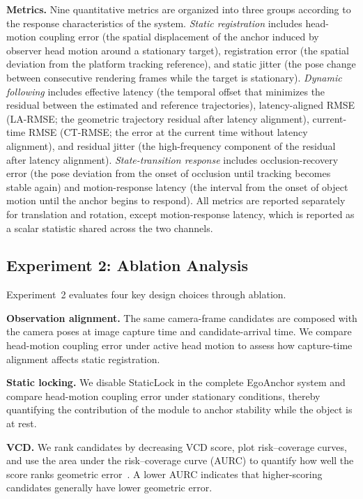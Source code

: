 \documentclass[review]{vgtc}
\begin{document}
\textbf{Metrics.}
Nine quantitative metrics are organized into three groups according to the response characteristics of the system. \textit{Static registration} includes head-motion coupling error (the spatial displacement of the anchor induced by observer head motion around a stationary target), registration error (the spatial deviation from the platform tracking reference), and static jitter (the pose change between consecutive rendering frames while the target is stationary). \textit{Dynamic following} includes effective latency (the temporal offset that minimizes the residual between the estimated and reference trajectories), latency-aligned RMSE (LA-RMSE; the geometric trajectory residual after latency alignment), current-time RMSE (CT-RMSE; the error at the current time without latency alignment), and residual jitter (the high-frequency component of the residual after latency alignment). \textit{State-transition response} includes occlusion-recovery error (the pose deviation from the onset of occlusion until tracking becomes stable again) and motion-response latency (the interval from the onset of object motion until the anchor begins to respond). All metrics are reported separately for translation and rotation, except motion-response latency, which is reported as a scalar statistic shared across the two channels.

\subsection{Experiment 2: Ablation Analysis}\label{sec:exp2-design}

Experiment~2 evaluates four key design choices through ablation.

\textbf{Observation alignment.}
The same camera-frame candidates are composed with the camera poses at image capture time and candidate-arrival time. We compare head-motion coupling error under active head motion to assess how capture-time alignment affects static registration.

\textbf{Static locking.}
We disable StaticLock in the complete EgoAnchor system and compare head-motion coupling error under stationary conditions, thereby quantifying the contribution of the module to anchor stability while the object is at rest.

\textbf{VCD.}
We rank candidates by decreasing VCD score, plot risk--coverage curves, and use the area under the risk--coverage curve (AURC) to quantify how well the score ranks geometric error~\cite{riskcontrolled2020,ding2020uncertainty}. A lower AURC indicates that higher-scoring candidates generally have lower geometric error.
\end{document}
